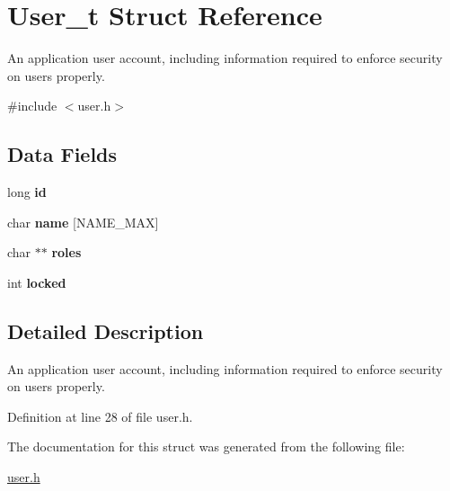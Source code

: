 \hypertarget{struct_user__t}{
\section{User\_\-t Struct Reference}
\label{struct_user__t}
}


An application user account, including information required to enforce security on users properly.  




{\ttfamily \#include $<$user.h$>$}

\subsection*{Data Fields}
\begin{DoxyCompactItemize}
\item 
\hypertarget{struct_user__t_aad27530f62b6abe7bc90bcbaeb402ffd}{
long {\bfseries id}}
\label{struct_user__t_aad27530f62b6abe7bc90bcbaeb402ffd}

\item 
\hypertarget{struct_user__t_a2277e1b6190db00837c4a16661ab88a0}{
char {\bfseries name} \mbox{[}NAME\_\-MAX\mbox{]}}
\label{struct_user__t_a2277e1b6190db00837c4a16661ab88a0}

\item 
\hypertarget{struct_user__t_ae23c43664a9c18e42288602b1b19773c}{
char $\ast$$\ast$ {\bfseries roles}}
\label{struct_user__t_ae23c43664a9c18e42288602b1b19773c}

\item 
\hypertarget{struct_user__t_a1b6d75f50d1cd48b06083a27ef6b9912}{
int {\bfseries locked}}
\label{struct_user__t_a1b6d75f50d1cd48b06083a27ef6b9912}

\end{DoxyCompactItemize}


\subsection{Detailed Description}
An application user account, including information required to enforce security on users properly. 

Definition at line 28 of file user.h.



The documentation for this struct was generated from the following file:\begin{DoxyCompactItemize}
\item 
\hyperlink{user_8h}{user.h}\end{DoxyCompactItemize}

